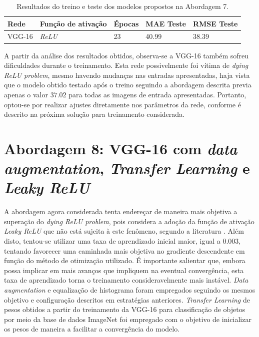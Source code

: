 \begin{table}[!ht]
	\centering
	\caption{Resultados do treino e teste dos modelos propostos na Abordagem 7.}
	\label{tab:results-7}
		\begin{tabular}{l l l l l }
			\toprule
			Rede & Função de ativação & Épocas & MAE Teste & RMSE Teste \\
			\midrule
			VGG-16 & \emph{ReLU} & 23 & 40.99 & 38.39 \\
			\bottomrule
		\end{tabular}
	\end{table}

	A partir da análise dos resultados obtidos, observa-se a VGG-16 também sofreu dificuldades durante o treinamento. Esta rede possivelmente foi vítima de \emph{dying ReLU problem}, mesmo havendo mudanças nas entradas apresentadas, haja vista que o modelo obtido testado após o treino seguindo a abordagem descrita previa apenas o valor $37.02$ para todas as imagens de entrada apresentadas. Portanto, optou-se por realizar ajustes diretamente nos parâmetros da rede, conforme é descrito na próxima solução para treinamento considerada.

\section{Abordagem 8: VGG-16 com \emph{data augmentation}, \emph{Transfer Learning} e \emph{Leaky ReLU}}

 A abordagem agora considerada tenta endereçar de maneira mais objetiva a superação do \emph{dying ReLU problem}, pois considera a adoção da função de ativação \emph{Leaky ReLU} que não está sujeita à este fenômeno, segundo a literatura \cite{djork2015elus}. Além disto, tentou-se utilizar uma taxa de aprendizado inicial maior, igual a $0.003$, tentando favorecer uma caminhada mais objetiva no gradiente descendente em função do método de otimização utilizado. É importante salientar que, embora possa implicar em mais avanços que impliquem na eventual convergência, esta taxa de aprendizado torna o treinamento consideravelmente mais instável. \emph{Data augmentation} e equalização de histograma foram empregados seguindo os mesmos objetivo e configuração descritos em estratégias anteriores. \emph{Transfer Learning} de pesos obtidos a partir do treinamento da VGG-16 para classificação de objetos por meio da base de dados ImageNet foi empregado com o objetivo de inicializar os pesos de maneira a facilitar a convergência do modelo.

